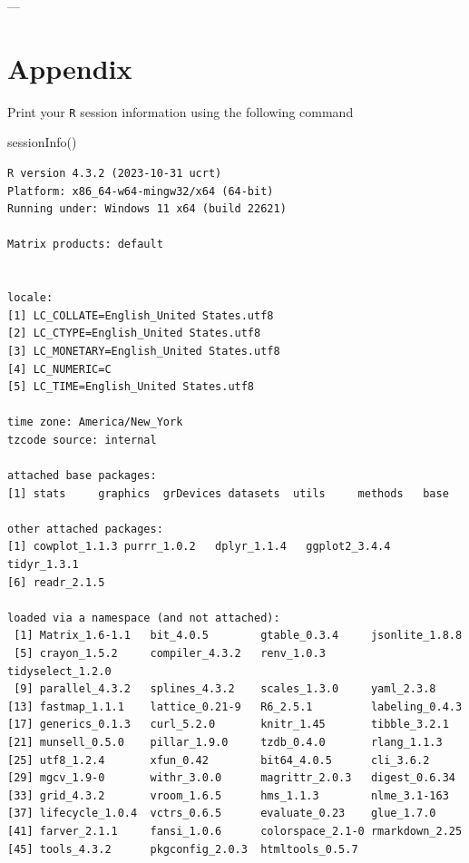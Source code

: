 \documentclass[
  letterpaper,
  DIV=11,
  numbers=noendperiod]{scrartcl}
\newenvironment{Shaded}{\begin{snugshade}}{\end{snugshade}}
\newcommand{\FunctionTok}[1]{\textcolor[rgb]{0.28,0.35,0.67}{#1}}
\newcommand{\NormalTok}[1]{\textcolor[rgb]{0.00,0.23,0.31}{#1}}
\begin{document}
\pagebreak

---

\hypertarget{appendix}{%
\section{Appendix}\label{appendix}}

\begin{tcolorbox}[enhanced jigsaw, opacityback=0, colback=white, rightrule=.15mm, colframe=quarto-callout-note-color-frame, opacitybacktitle=0.6, title=\textcolor{quarto-callout-note-color}{\faInfo}\hspace{0.5em}{Session Information}, breakable, bottomtitle=1mm, arc=.35mm, titlerule=0mm, toptitle=1mm, leftrule=.75mm, left=2mm, bottomrule=.15mm, toprule=.15mm, coltitle=black, colbacktitle=quarto-callout-note-color!10!white]

Print your \texttt{R} session information using the following command

\begin{Shaded}
\begin{Highlighting}[]
\FunctionTok{sessionInfo}\NormalTok{()}
\end{Highlighting}
\end{Shaded}

\begin{verbatim}
R version 4.3.2 (2023-10-31 ucrt)
Platform: x86_64-w64-mingw32/x64 (64-bit)
Running under: Windows 11 x64 (build 22621)

Matrix products: default


locale:
[1] LC_COLLATE=English_United States.utf8 
[2] LC_CTYPE=English_United States.utf8   
[3] LC_MONETARY=English_United States.utf8
[4] LC_NUMERIC=C                          
[5] LC_TIME=English_United States.utf8    

time zone: America/New_York
tzcode source: internal

attached base packages:
[1] stats     graphics  grDevices datasets  utils     methods   base     

other attached packages:
[1] cowplot_1.1.3 purrr_1.0.2   dplyr_1.1.4   ggplot2_3.4.4 tidyr_1.3.1  
[6] readr_2.1.5  

loaded via a namespace (and not attached):
 [1] Matrix_1.6-1.1   bit_4.0.5        gtable_0.3.4     jsonlite_1.8.8  
 [5] crayon_1.5.2     compiler_4.3.2   renv_1.0.3       tidyselect_1.2.0
 [9] parallel_4.3.2   splines_4.3.2    scales_1.3.0     yaml_2.3.8      
[13] fastmap_1.1.1    lattice_0.21-9   R6_2.5.1         labeling_0.4.3  
[17] generics_0.1.3   curl_5.2.0       knitr_1.45       tibble_3.2.1    
[21] munsell_0.5.0    pillar_1.9.0     tzdb_0.4.0       rlang_1.1.3     
[25] utf8_1.2.4       xfun_0.42        bit64_4.0.5      cli_3.6.2       
[29] mgcv_1.9-0       withr_3.0.0      magrittr_2.0.3   digest_0.6.34   
[33] grid_4.3.2       vroom_1.6.5      hms_1.1.3        nlme_3.1-163    
[37] lifecycle_1.0.4  vctrs_0.6.5      evaluate_0.23    glue_1.7.0      
[41] farver_2.1.1     fansi_1.0.6      colorspace_2.1-0 rmarkdown_2.25  
[45] tools_4.3.2      pkgconfig_2.0.3  htmltools_0.5.7 
\end{verbatim}

\end{tcolorbox}
\end{document}
